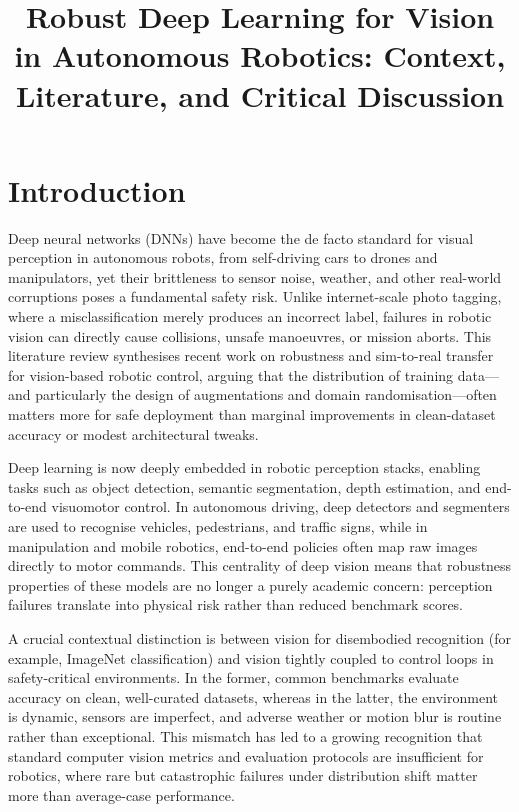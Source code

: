\documentclass[11pt,a4paper]{article}
\title{Robust Deep Learning for Vision in Autonomous Robotics: Context, Literature, and Critical Discussion}
\author{}
\date{}
\begin{document}
\maketitle

\section{Introduction}
Deep neural networks (DNNs) have become the de facto standard for visual perception in autonomous robots, from self-driving cars to drones and manipulators, yet their brittleness to sensor noise, weather, and other real-world corruptions poses a fundamental safety risk. Unlike internet-scale photo tagging, where a misclassification merely produces an incorrect label, failures in robotic vision can directly cause collisions, unsafe manoeuvres, or mission aborts. This literature review synthesises recent work on robustness and sim-to-real transfer for vision-based robotic control, arguing that the distribution of training data---and particularly the design of augmentations and domain randomisation---often matters more for safe deployment than marginal improvements in clean-dataset accuracy or modest architectural tweaks.

Deep learning is now deeply embedded in robotic perception stacks, enabling tasks such as object detection, semantic segmentation, depth estimation, and end-to-end visuomotor control. In autonomous driving, deep detectors and segmenters are used to recognise vehicles, pedestrians, and traffic signs, while in manipulation and mobile robotics, end-to-end policies often map raw images directly to motor commands. This centrality of deep vision means that robustness properties of these models are no longer a purely academic concern: perception failures translate into physical risk rather than reduced benchmark scores.

A crucial contextual distinction is between vision for disembodied recognition (for example, ImageNet classification) and vision tightly coupled to control loops in safety-critical environments. In the former, common benchmarks evaluate accuracy on clean, well-curated datasets, whereas in the latter, the environment is dynamic, sensors are imperfect, and adverse weather or motion blur is routine rather than exceptional. This mismatch has led to a growing recognition that standard computer vision metrics and evaluation protocols are insufficient for robotics, where rare but catastrophic failures under distribution shift matter more than average-case performance.
\end{document}
